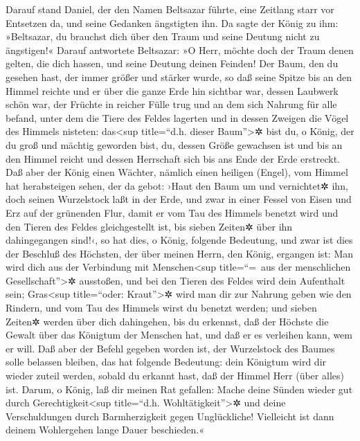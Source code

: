 Darauf stand Daniel, der den Namen Beltsazar führte, eine
Zeitlang starr vor Entsetzen da, und seine Gedanken ängstigten ihn. Da
sagte der König zu ihm: »Beltsazar, du brauchst dich über den Traum und
seine Deutung nicht zu ängstigen!« Darauf antwortete Beltsazar: »O Herr,
möchte doch der Traum denen gelten, die dich hassen, und seine Deutung
deinen Feinden! Der Baum, den du gesehen hast, der immer
größer und stärker wurde, so daß seine Spitze bis an den Himmel reichte
und er über die ganze Erde hin sichtbar war, dessen
Laubwerk schön war, der Früchte in reicher Fülle trug und an dem sich
Nahrung für alle befand, unter dem die Tiere des Feldes lagerten und in
dessen Zweigen die Vögel des Himmels nisteten:
das\textless sup title=``d.h. dieser Baum''\textgreater✲
bist du, o König, der du groß und mächtig geworden bist, du, dessen
Größe gewachsen ist und bis an den Himmel reicht und dessen Herrschaft
sich bis ans Ende der Erde erstreckt. Daß aber der König
einen Wächter, nämlich einen heiligen (Engel), vom Himmel hat
herabsteigen sehen, der da gebot: ›Haut den Baum um und vernichtet✲ ihn,
doch seinen Wurzelstock laßt in der Erde, und zwar in einer Fessel von
Eisen und Erz auf der grünenden Flur, damit er vom Tau des Himmels
benetzt wird und den Tieren des Feldes gleichgestellt ist, bis sieben
Zeiten✲ über ihn dahingegangen sind!‹, so hat dies, o
König, folgende Bedeutung, und zwar ist dies der Beschluß des Höchsten,
der über meinen Herrn, den König, ergangen ist: Man wird
dich aus der Verbindung mit Menschen\textless sup title=``=~aus der
menschlichen Gesellschaft''\textgreater✲ ausstoßen, und bei den Tieren
des Feldes wird dein Aufenthalt sein; Gras\textless sup title=``oder:
Kraut''\textgreater✲ wird man dir zur Nahrung geben wie den Rindern, und
vom Tau des Himmels wirst du benetzt werden; und sieben Zeiten✲ werden
über dich dahingehen, bis du erkennst, daß der Höchste die Gewalt über
das Königtum der Menschen hat, und daß er es verleihen kann, wem er
will. Daß aber der Befehl gegeben worden ist, der
Wurzelstock des Baumes solle belassen bleiben, das hat folgende
Bedeutung: dein Königtum wird dir wieder zuteil werden, sobald du
erkannt hast, daß der Himmel Herr (über alles) ist.
Darum, o König, laß dir meinen Rat gefallen: Mache deine
Sünden wieder gut durch Gerechtigkeit\textless sup title=``d.h.
Wohltätigkeit''\textgreater✲ und deine Verschuldungen durch
Barmherzigkeit gegen Unglückliche! Vielleicht ist dann deinem
Wohlergehen lange Dauer beschieden.«

